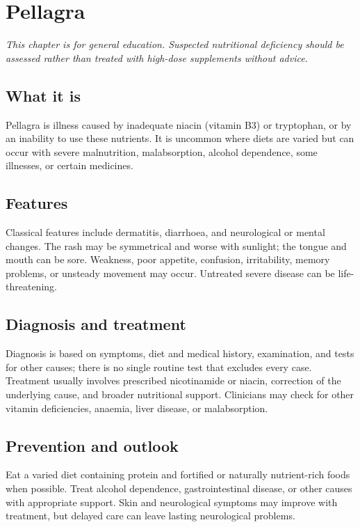 \chapter{Pellagra}

\medskip
\noindent\textit{This chapter is for general education. Suspected nutritional deficiency should be assessed rather than treated with high-dose supplements without advice.}

\section*{What it is}
Pellagra is illness caused by inadequate niacin (vitamin B3) or tryptophan, or by an inability to use these nutrients. It is uncommon where diets are varied but can occur with severe malnutrition, malabsorption, alcohol dependence, some illnesses, or certain medicines.

\section*{Features}
Classical features include dermatitis, diarrhoea, and neurological or mental changes. The rash may be symmetrical and worse with sunlight; the tongue and mouth can be sore. Weakness, poor appetite, confusion, irritability, memory problems, or unsteady movement may occur. Untreated severe disease can be life-threatening.

\section*{Diagnosis and treatment}
Diagnosis is based on symptoms, diet and medical history, examination, and tests for other causes; there is no single routine test that excludes every case. Treatment usually involves prescribed nicotinamide or niacin, correction of the underlying cause, and broader nutritional support. Clinicians may check for other vitamin deficiencies, anaemia, liver disease, or malabsorption.

\section*{Prevention and outlook}
Eat a varied diet containing protein and fortified or naturally nutrient-rich foods when possible. Treat alcohol dependence, gastrointestinal disease, or other causes with appropriate support. Skin and neurological symptoms may improve with treatment, but delayed care can leave lasting neurological problems.

